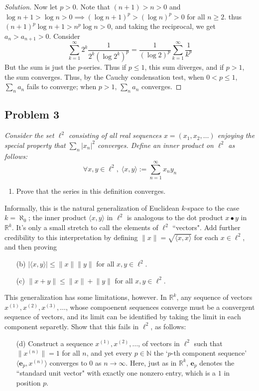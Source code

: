 \documentclass{article}
\newcommand{\N}{{\mathbb N}}
\newcommand{\R}{{\mathbb R}}
\begin{document}
\begin{enumerate}
\begin{proof}[Solution]
		Now let $p > 0$.
		Note that $(n+1) > n > 0$ and $\log{n+1} > \log{n} > 0
		\implies (\log{n+1})^p > (\log{n})^p > 0$ for all $n \geq 2$.
		thus $(n+1)^p\log{n+1} > n^p\log{n} > 0$,
		and taking the reciprocal, we get $a_n > a_{n+1} > 0$.
		Consider
		\[
			\sum_{k=1}^\infty 2^k\frac{1}{2^k(\log{2^k})^p}
			= \frac{1}{(\log{2})^p} \sum_{k=1}^\infty \frac{1}{k^p}
		\]
		But the sum is just the $p$-series.
		Thus if $p \leq 1$, this sum diverges,
		and if $p > 1$, the sum converges.
		Thus, by the Cauchy condensation test,
		when $0 < p \leq 1$, $\sum_n a_n$ fails to converge;
		when $p > 1$, $\sum_n a_n$ converges.
	\end{proof}
\end{enumerate}
\clearpage

\subsection*{Problem 3}
{\it Consider the set $\ell^2$ consisting of all real sequences
$x = (x_1, x_2, \dots)$ enjoying the special property that
$\sum_n |x_n|^2$ converges.
Define an inner product on $\ell^2$ as follows:
\[
	\forall x,y \in \ell^2, \; \langle x, y \rangle := \sum_{n=1}^\infty x_ny_n
\]
\begin{enumerate}
	\item Prove that the series in this definition converges.
\end{enumerate}
Informally, this is the natural generalization of Euclidean $k$-space
to the case $k = \aleph_0$;
the inner product $\langle x,y \rangle$ in $\ell^2$ is
analogous to the dot product $x \bullet y$ in $\R^k$.
It's only a small stretch to call the elements of $\ell^2$ ``vectors".
Add further credibility to this interpretation by defining
$\lVert x \rVert = \sqrt{\langle x , x\rangle}$
for each $x \in \ell^2$, and then proving
\begin{enumerate}
	\item[(b)] $\lvert \langle x,y \rangle| \leq \lVert x \rVert\lVert y \rVert$
		for all $x,y \in \ell^2$.
	\item[(c)] $\lVert x + y \rVert \leq \lVert x \rVert + \lVert y \rVert$ for all $x,y \in \ell^2$.
\end{enumerate}
This generalization has some limitations, however.
In $\R^k$, any sequence of vectors $x^{(1)},x^{(2)},x^{(3)},\dots$,
whose compoenent sequences converge must be a convergent sequence of vectors,
and its limit can be identified by taking the limit in each component separetly.
Show that this fails in $\ell^2$, as follows:
\begin{enumerate}
	\item[(d)] Construct a sequence $x^{(1)},x^{(2)},\dots$, of vectors in $\ell^2$
		such that $\lVert x^{(n)} \rVert = 1$ for all $n$,
		and yet every $p \in \N$ the `$p$-th component sequence'
		$\langle \mathbf{e}_p, x^{(n)}\rangle$ converges to $0$ as $n \to \infty$.
		Here, just as in $\R^k$, $\mathbf{e}_p$ denotes the ``standard unit vector"
		with exactly one nonzero entry,
		which is a $1$ in position $p$.
\end{enumerate}}
\end{document}
